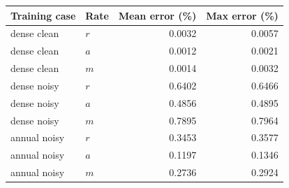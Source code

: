 \begin{tabular}{llrr}
\toprule
Training case & Rate & Mean error (\%) & Max error (\%) \\
\midrule
dense clean & $r$ & 0.0032 & 0.0057 \\
dense clean & $a$ & 0.0012 & 0.0021 \\
dense clean & $m$ & 0.0014 & 0.0032 \\
dense noisy & $r$ & 0.6402 & 0.6466 \\
dense noisy & $a$ & 0.4856 & 0.4895 \\
dense noisy & $m$ & 0.7895 & 0.7964 \\
annual noisy & $r$ & 0.3453 & 0.3577 \\
annual noisy & $a$ & 0.1197 & 0.1346 \\
annual noisy & $m$ & 0.2736 & 0.2924 \\
\bottomrule\end{tabular}
